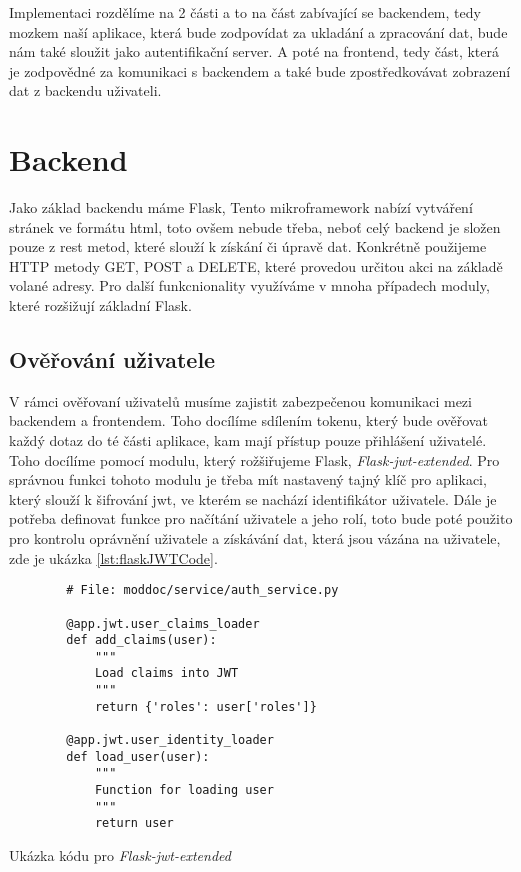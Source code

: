 Implementaci rozdělíme na 2 části a to na část zabívající se backendem, tedy mozkem naší aplikace, která bude zodpovídat
za ukladání a zpracování dat, bude nám také sloužit jako autentifikační server. A poté na frontend, tedy část, která
je zodpovědné za komunikaci s backendem a také bude zpostředkovávat zobrazení dat z backendu uživateli.

\section{Backend}

Jako základ backendu máme Flask,  \cite{flaskDoc}
Tento mikroframework nabízí vytváření stránek ve formátu \gls{html}, toto ovšem nebude třeba, neboť celý backend je složen pouze z rest metod,
které slouží k získání či úpravě dat. Konkrétně použijeme HTTP metody GET, POST a DELETE, které provedou určitou akci na základě volané adresy.
Pro další funkcnionality využíváme v mnoha případech moduly, které rozšižují základní Flask.

\subsection{Ověřování uživatele}

V rámci ověřovaní uživatelů musíme zajistit zabezpečenou komunikaci mezi backendem a frontendem. Toho docílíme sdílením tokenu, který bude ověřovat
každý dotaz do té části aplikace, kam mají přístup pouze přihlášení uživatelé. Toho docílíme pomocí modulu, který rožšiřujeme Flask,
\textit{Flask-jwt-extended}. Pro správnou funkci tohoto modulu je třeba mít nastavený tajný klíč pro aplikaci, který slouží k šifrování \gls{jwt},
ve kterém se nachází identifikátor uživatele. Dále je potřeba definovat funkce pro načítání uživatele a jeho rolí, toto bude poté použito pro kontrolu
oprávnění uživatele a získávání dat, která jsou vázána na uživatele, zde je ukázka \ref{lst:flaskJWTCode}.

\begin{listing}
    \begin{verbatim}
        # File: moddoc/service/auth_service.py

        @app.jwt.user_claims_loader
        def add_claims(user):
            """
            Load claims into JWT
            """
            return {'roles': user['roles']}

        @app.jwt.user_identity_loader
        def load_user(user):
            """
            Function for loading user
            """
            return user
    \end{verbatim}
    \caption{Ukázka kódu pro \textit{Flask-jwt-extended}}
    \label{lst:flaskJWTCode}
\end{listing}

